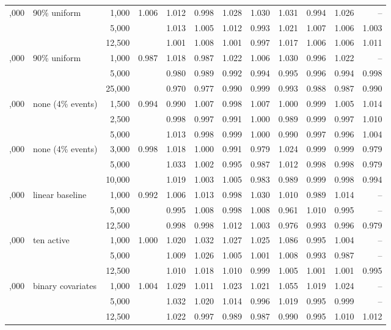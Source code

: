 \begin{tabular}{rlrrrrrrrrrr}
\addlinespace
25,000 & 90\% uniform & 1,000 & 1.006 & 1.012 & 0.998 & 1.028 & 1.030 & 1.031 & 0.994 & 1.026 & --\\
 &  & 5,000 &  & 1.013 & 1.005 & 1.012 & 0.993 & 1.021 & 1.007 & 1.006 & 1.003\\
 &  & 12,500 &  & 1.001 & 1.008 & 1.001 & 0.997 & 1.017 & 1.006 & 1.006 & 1.011\\
\addlinespace
50,000 & 90\% uniform & 1,000 & 0.987 & 1.018 & 0.987 & 1.022 & 1.006 & 1.030 & 0.996 & 1.022 & --\\
 &  & 5,000 &  & 0.980 & 0.989 & 0.992 & 0.994 & 0.995 & 0.996 & 0.994 & 0.998\\
 &  & 25,000 &  & 0.970 & 0.977 & 0.990 & 0.999 & 0.993 & 0.988 & 0.987 & 0.990\\
\addlinespace
25,000 & none (4\% events) & 1,500 & 0.994 & 0.990 & 1.007 & 0.998 & 1.007 & 1.000 & 0.999 & 1.005 & 1.014\\
 &  & 2,500 &  & 0.998 & 0.997 & 0.991 & 1.000 & 0.989 & 0.999 & 0.997 & 1.010\\
 &  & 5,000 &  & 1.013 & 0.998 & 0.999 & 1.000 & 0.990 & 0.997 & 0.996 & 1.004\\
\addlinespace
50,000 & none (4\% events) & 3,000 & 0.998 & 1.018 & 1.000 & 0.991 & 0.979 & 1.024 & 0.999 & 0.999 & 0.979\\
 &  & 5,000 &  & 1.033 & 1.002 & 0.995 & 0.987 & 1.012 & 0.998 & 0.998 & 0.979\\
 &  & 10,000 &  & 1.019 & 1.003 & 1.005 & 0.983 & 0.989 & 0.999 & 0.998 & 0.994\\
\addlinespace
25,000 & linear baseline & 1,000 & 0.992 & 1.006 & 1.013 & 0.998 & 1.030 & 1.010 & 0.989 & 1.014 & --\\
 &  & 5,000 &  & 0.995 & 1.008 & 0.998 & 1.008 & 0.961 & 1.010 & 0.995 & --\\
 &  & 12,500 &  & 0.998 & 0.998 & 1.012 & 1.003 & 0.976 & 0.993 & 0.996 & 0.979\\
\addlinespace
25,000 & ten active & 1,000 & 1.000 & 1.020 & 1.032 & 1.027 & 1.025 & 1.086 & 0.995 & 1.004 & --\\
 &  & 5,000 &  & 1.009 & 1.026 & 1.005 & 1.001 & 1.008 & 0.993 & 0.987 & --\\
 &  & 12,500 &  & 1.010 & 1.018 & 1.010 & 0.999 & 1.005 & 1.001 & 1.001 & 0.995\\
\addlinespace
25,000 & binary covariates & 1,000 & 1.004 & 1.029 & 1.011 & 1.023 & 1.021 & 1.055 & 1.019 & 1.024 & --\\
 &  & 5,000 &  & 1.032 & 1.020 & 1.014 & 0.996 & 1.019 & 0.995 & 0.999 & --\\
 &  & 12,500 &  & 1.022 & 0.997 & 0.989 & 0.987 & 0.990 & 0.995 & 1.010 & 1.012\\
\bottomrule
\end{tabular}
